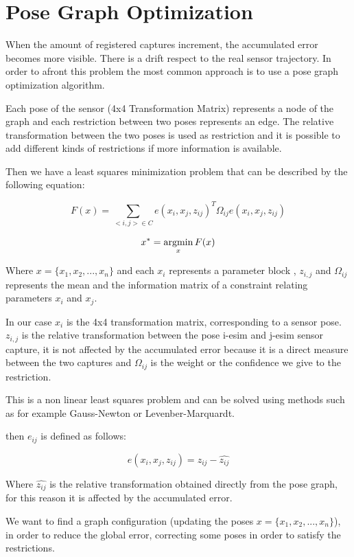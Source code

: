 \section{Pose Graph Optimization}

When the amount of registered captures increment, the accumulated error 
becomes more visible. There is a drift respect to the real sensor trajectory. 
In order to afront this problem the most common approach is to use a pose graph 
optimization algorithm. 

Each pose of the sensor (4x4 Transformation Matrix) represents a node of the 
graph and each restriction between two poses represents an edge. The relative 
transformation between the two poses is used as restriction and it is possible 
to add different kinds of restrictions if more information is available.

Then we have a least squares minimization problem that can be described by the following equation:

$$ F(x) = \sum\limits_{<i,j> \in C } e(x_i,x_j,z_{ij})^T \Omega_{ij} e(x_i,x_j,z_{ij}) $$

$$ x^* = \mathop{\rm argmin}_x F(x) $$

Where $x=\{x_1,x_2,...,x_n\}$ and each $x_i$ represents a parameter block , $z_{i,j}$ and $\Omega_{ij}$ represents the mean  
 and the information matrix  of a constraint 
relating parameters $x_i$ and $x_j$.

In our case $x_i$ is the 4x4 transformation matrix, corresponding to a sensor pose. $z_{i,j}$ is the 
relative transformation between the pose i-esim and j-esim sensor capture, it is not affected by the accumulated error 
because it is a direct measure between the two captures and $\Omega_{ij}$ is the weight or 
the confidence we give to the restriction.

This is a non linear least squares problem and can be solved using 
methods such as for example Gauss-Newton or Levenber-Marquardt.


then $e_{ij}$ is defined as follows:

$$
e(x_i,x_j,z_{ij}) = z_{ij} - \hat{z_{ij}}
$$

Where $\hat{z_{ij}}$ is the relative transformation obtained directly from the pose graph, for this reason 
it is affected by the accumulated error.

We want to find a graph configuration (updating the poses $x=\{x_1,x_2,...,x_n\}$), in order to reduce 
the global error, correcting some poses in order to satisfy the restrictions.

